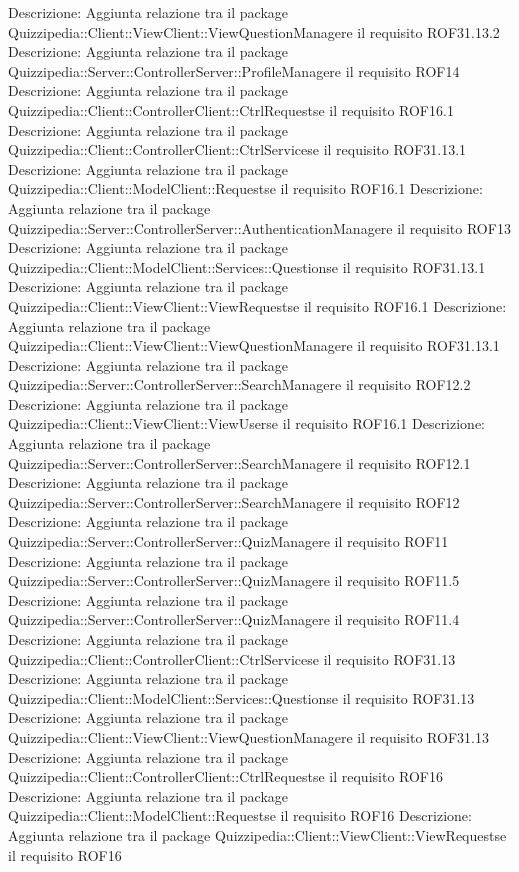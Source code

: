 Descrizione: Aggiunta relazione tra il package Quizzipedia::Client::ViewClient::ViewQuestionManagere il requisito ROF31.13.2 
Descrizione: Aggiunta relazione tra il package Quizzipedia::Server::ControllerServer::ProfileManagere il requisito ROF14 
Descrizione: Aggiunta relazione tra il package Quizzipedia::Client::ControllerClient::CtrlRequestse il requisito ROF16.1 
Descrizione: Aggiunta relazione tra il package Quizzipedia::Client::ControllerClient::CtrlServicese il requisito ROF31.13.1 
Descrizione: Aggiunta relazione tra il package Quizzipedia::Client::ModelClient::Requestse il requisito ROF16.1 
Descrizione: Aggiunta relazione tra il package Quizzipedia::Server::ControllerServer::AuthenticationManagere il requisito ROF13 
Descrizione: Aggiunta relazione tra il package Quizzipedia::Client::ModelClient::Services::Questionse il requisito ROF31.13.1 
Descrizione: Aggiunta relazione tra il package Quizzipedia::Client::ViewClient::ViewRequestse il requisito ROF16.1 
Descrizione: Aggiunta relazione tra il package Quizzipedia::Client::ViewClient::ViewQuestionManagere il requisito ROF31.13.1 
Descrizione: Aggiunta relazione tra il package Quizzipedia::Server::ControllerServer::SearchManagere il requisito ROF12.2 
Descrizione: Aggiunta relazione tra il package Quizzipedia::Client::ViewClient::ViewUserse il requisito ROF16.1 
Descrizione: Aggiunta relazione tra il package Quizzipedia::Server::ControllerServer::SearchManagere il requisito ROF12.1 
Descrizione: Aggiunta relazione tra il package Quizzipedia::Server::ControllerServer::SearchManagere il requisito ROF12 
Descrizione: Aggiunta relazione tra il package Quizzipedia::Server::ControllerServer::QuizManagere il requisito ROF11 
Descrizione: Aggiunta relazione tra il package Quizzipedia::Server::ControllerServer::QuizManagere il requisito ROF11.5 
Descrizione: Aggiunta relazione tra il package Quizzipedia::Server::ControllerServer::QuizManagere il requisito ROF11.4 
Descrizione: Aggiunta relazione tra il package Quizzipedia::Client::ControllerClient::CtrlServicese il requisito ROF31.13 
Descrizione: Aggiunta relazione tra il package Quizzipedia::Client::ModelClient::Services::Questionse il requisito ROF31.13 
Descrizione: Aggiunta relazione tra il package Quizzipedia::Client::ViewClient::ViewQuestionManagere il requisito ROF31.13 
Descrizione: Aggiunta relazione tra il package Quizzipedia::Client::ControllerClient::CtrlRequestse il requisito ROF16 
Descrizione: Aggiunta relazione tra il package Quizzipedia::Client::ModelClient::Requestse il requisito ROF16 
Descrizione: Aggiunta relazione tra il package Quizzipedia::Client::ViewClient::ViewRequestse il requisito ROF16 
